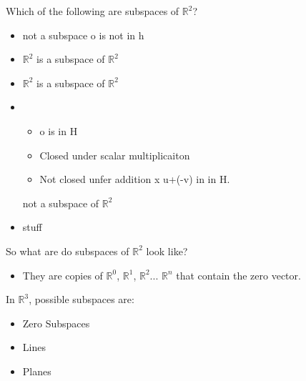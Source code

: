 \begin{ex}
Which of the following are subspaces of $\mathbb{R}^{2}$?

\begin{itemize}
    \item %
    not a subspace o is not in h
    \item %
    $\mathbb{R}^2$ is a subspace of $\mathbb{R}^2$
    \item %
    $\mathbb{R}^2$ is a subspace of $\mathbb{R}^2$
    \item %
    \begin{itemize}
        \item o is in H \checkmark
        \item Closed under scalar multiplicaiton \checkmark
        \item Not closed unfer addition x u+(-v) in in H.
    \end{itemize}
    not a subspace of $\mathbb{R}^2$
    \item %
    stuff
\end{itemize}
\end{ex}
So what are do subspaces of $\mathbb{R}^2$ look like?
\begin{itemize}
    \item They are copies of $\mathbb{R}^0$, $\mathbb{R}^1$, $\mathbb{R}^2$... $\mathbb{R}^n$ that contain the zero vector.
\end{itemize}
\begin{ex}
In $\mathbb{R}^3$, possible subspaces are:
\begin{itemize}
    \item Zero Subspaces
    \item Lines
    \item Planes
\end{itemize}
\end{ex}
